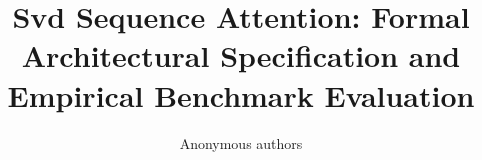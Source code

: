 \title{\textbf{Svd Sequence Attention: Formal Architectural Specification and Empirical Benchmark Evaluation}}

\author{Anonymous authors}
